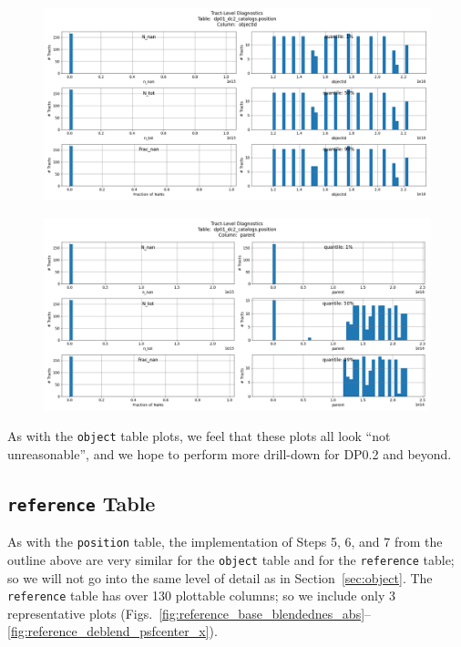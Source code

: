 \documentclass[DM,authoryear,toc]{lsstdoc}
\begin{document}
\begin{figure}[h]
\centering
\includegraphics[width=1.0\linewidth]{Plots/TAP_verify_DP01.dp01_dc2_catalogs.position.objectId.png}
\caption{}
\label{fig:position_objectId}
\end{figure}

\begin{figure}[h]
\centering
\includegraphics[width=1.0\linewidth]{Plots/TAP_verify_DP01.dp01_dc2_catalogs.position.parent.png}
\caption{}
\label{fig:position_parent}
\end{figure}


As with the \texttt{object} table plots, we feel that these plots all
look ``not unreasonable'', and we hope to perform more drill-down for
DP0.2 and beyond.





\subsection{\texttt{reference} Table} \label{sec:reference}

As with the \texttt{position} table, the implementation of Steps 5, 6,
and 7 from the outline above are very similar for the \texttt{object}
table and for the \texttt{reference} table; so we will not go into the
same level of detail as in Section~\ref{sec:object}.  The
\texttt{reference} table has over 130 plottable columns; so we
include only 3 representative plots
(Figs.~\ref{fig:reference_base_blendednes_abs}--\ref{fig:reference_deblend_psfcenter_x}).
\end{document}
